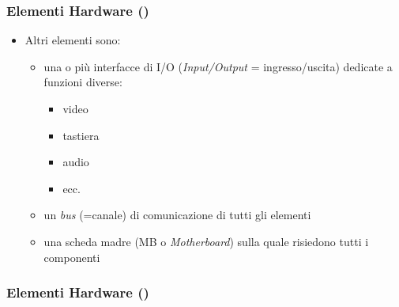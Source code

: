 \begin{frame}
    \frametitle{Elementi Hardware ()}

	\begin{itemize}[<+- | alert@+->]

		\item Altri elementi sono:

			 \begin{itemize}[<+- | alert@+->]
			 \setlength{\itemsep}{4mm}

				\item una o pi\`u interfacce di I/O
				      (\emph{Input/Output} = ingresso/uscita)
					  dedicate a funzioni diverse:

					\vspace{4mm}
					\begin{itemize}[<+- | alert@+->]

						\item video

						\item tastiera

						\item audio

						\item ecc.

					\end{itemize}

				\item un \emph{bus} (=canale) di comunicazione
				      di tutti gli elementi

				\item una scheda madre (MB o \emph{Motherboard})
				      sulla quale risiedono tutti i componenti

			\end{itemize}

	\end{itemize}

\end{frame}

\begin{frame}
    \frametitle{Elementi Hardware ()}

	\begin{center}
	\end{center}

\end{frame}
